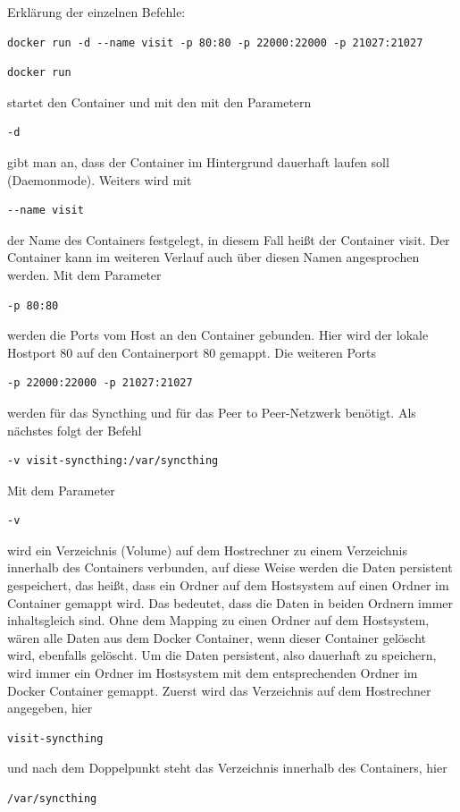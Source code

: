 Erklärung der einzelnen Befehle:\\
\begin{lstlisting}[style=MyBashStyle]
docker run -d --name visit -p 80:80 -p 22000:22000 -p 21027:21027 
\end{lstlisting}

\begin{lstlisting}[style=MyBashStyle]
docker run 
\end{lstlisting}
 startet den Container und mit den mit den Parametern \begin{lstlisting}[style=MyBashStyle]
-d 
\end{lstlisting} gibt man an, dass der Container im Hintergrund dauerhaft laufen soll (Daemonmode). Weiters wird mit \begin{lstlisting}[style=MyBashStyle]
--name visit
\end{lstlisting} der Name des Containers festgelegt, in diesem Fall heißt der Container visit. Der Container kann im weiteren Verlauf auch über diesen Namen angesprochen werden.
Mit dem Parameter
\begin{lstlisting}[style=MyBashStyle]
-p 80:80
\end{lstlisting} werden die Ports vom Host an den Container gebunden. Hier wird der lokale Hostport 80 auf den Containerport 80 gemappt. Die weiteren Ports 
\begin{lstlisting}[style=MyBashStyle]
-p 22000:22000 -p 21027:21027 
\end{lstlisting} werden für das Syncthing und für das Peer to Peer-Netzwerk benötigt.
Als nächstes folgt der Befehl 
\begin{lstlisting}[style=MyBashStyle]
-v visit-syncthing:/var/syncthing
\end{lstlisting}
Mit dem Parameter \begin{lstlisting}[style=MyBashStyle]
-v
\end{lstlisting}
 wird ein Verzeichnis (Volume) auf dem Hostrechner zu einem Verzeichnis innerhalb des Containers verbunden, auf diese Weise werden die Daten persistent gespeichert, das heißt, dass ein Ordner auf dem Hostsystem auf einen Ordner im Container gemappt wird. Das bedeutet, dass die Daten in beiden Ordnern immer inhaltsgleich sind. Ohne dem Mapping zu einen Ordner auf dem Hostsystem, wären alle Daten aus dem Docker Container, wenn dieser Container gelöscht wird, ebenfalls gelöscht. Um die Daten persistent, also dauerhaft zu speichern, wird immer ein Ordner im Hostsystem mit dem entsprechenden Ordner im Docker Container gemappt.
Zuerst wird das Verzeichnis auf dem Hostrechner angegeben, hier \begin{lstlisting}[style=MyBashStyle]
visit-syncthing
\end{lstlisting}
und nach dem Doppelpunkt steht das Verzeichnis innerhalb des Containers, hier \begin{lstlisting}[style=MyBashStyle]
/var/syncthing
\end{lstlisting}


